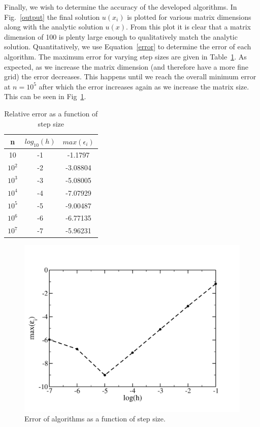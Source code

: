 \documentclass[prc,amsmath,twocolumn,superscriptaddress]{revtex4}
\begin{document}
Finally, we wish to determine the accuracy of the developed algorithms. In Fig.~\ref{output} the final solution $u(x_i)$ is plotted for various matrix dimensions along with the analytic solution $u(x)$. From this plot it is clear that a matrix dimension of 100 is plenty large enough to qualitatively match the analytic solution. Quantitatively, we use Equation~\ref{error} to determine the error of each algorithm. The maximum error for varying step sizes are given in Table~\ref{err_table}. As expected, as we increase the matrix dimension (and therefore have a more fine grid) the error decreases. This happens until we reach the overall minimum error at $n=10^5$ after which the error increases again as we increase the matrix size. This can be seen in Fig~\ref{err_fig}.

\begin{table}[t]
\centering
\begin{tabular}{|c|c|c|}
\hline
n&$log_{10}(h)$ & $max(\epsilon_i)$\\
\hline
10&-1&-1.1797\\
$10^2$&-2&-3.08804\\
$10^3$&-3&-5.08005\\
$10^4$&-4&-7.07929\\
$10^5$&-5&-9.00487\\
$10^6$&-6&-6.77135\\
$10^7$&-7&-5.96231\\
\hline
\end{tabular}
\caption{Relative error as a function of step size}
\label{err_table}
\end{table}

\begin{figure}[b]
\includegraphics[scale=0.33]{error}
\caption{Error of algorithms as a function of step size.}
\label{err_fig}
\end{figure}
\end{document}
